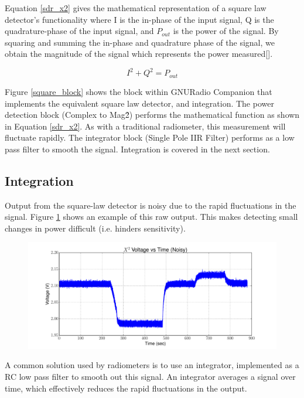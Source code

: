 Equation \ref{sdr_x2} gives the mathematical representation of a square law detector's functionality where I is the in-phase of the input signal, Q is the quadrature-phase of the input signal, and $P_{out}$ is the power of the signal.  By squaring and summing the in-phase and quadrature phase of the signal, we obtain the magnitude of the signal which represents the power measured[\cite{Rashid}].  

\begin{equation}\label{sdr_x2}
I^2+Q^2 = P_{out}
\end{equation}

Figure \ref{square_block} shows the block within GNURadio Companion that implements the equivalent square law detector, and integration.  The power detection block (Complex to Mag\^2) performs the mathematical function as shown in Equation \ref{sdr_x2}.  As with a traditional radiometer, this measurement will fluctuate rapidly.  The integrator block (Single Pole IIR Filter) performs as a low pass filter to smooth the signal.  Integration is covered in the next section.

\subsection{Integration}

Output from the square-law detector is noisy due to the rapid fluctuations in the signal.  Figure \ref{square_raw} shows an example of this raw output.  This makes detecting small changes in power difficult (i.e. hinders sensitivity).  

{\begin{figure}[h!tb] 
\centering
\includegraphics[width=17cm]{Experiments/Exp1/noisy_voltage.pdf}
\label{square_raw}
\end{figure}
}

A common solution used by radiometers is to use an integrator, implemented as a RC low pass filter to smooth out this signal.   An integrator averages a signal over time, which effectively reduces the rapid fluctuations in the output.

